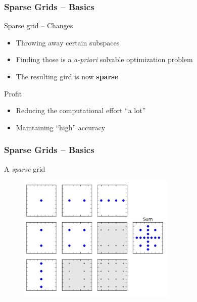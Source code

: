 \begin{frame}
  \frametitle{Sparse Grids -- Basics}
  \topline
  \vspace{-10px}
  \begin{block}{Sparse grid -- Changes}
    \begin{itemize}
      \item Throwing away certain subspaces
      \item Finding those is a \emph{a-priori} solvable optimization problem
      \item The resulting gird is now \textbf{sparse}
      \end{itemize}
  \end{block}
  \begin{block}{Profit}
    \begin{itemize}
      \item Reducing the computational effort ``a lot''
      \item Maintaining ``high'' accuracy
      \end{itemize}
  \end{block}
\end{frame}

\begin{frame}
  \frametitle{Sparse Grids -- Basics}
  \topline
  \vspace{-10px}
  \begin{block}{A \emph{sparse} grid}
    \begin{figure}[!htp]
      \centering
      \includegraphics[width=7.5cm]{images/sparsegrid_hirach2}
      \vspace{-12px}
      \caption{}
    \end{figure}
  \end{block}
\end{frame}

